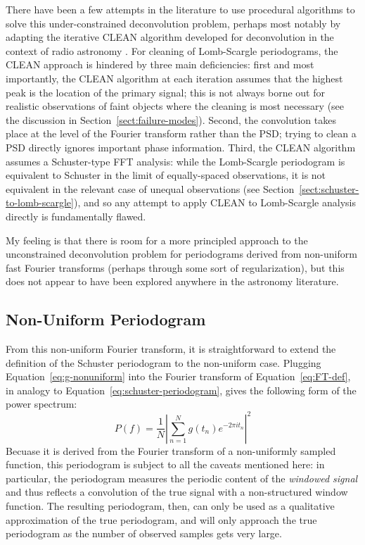 \documentclass[preprint]{aastex}
\newcommand{\Eq}[1]{Equation~\ref{eq:#1}}
\newcommand{\eq}[1]{\Eq{#1}}
\newcommand{\Sect}[1]{Section~\ref{sect:#1}}
\newcommand{\sect}[1]{\Sect{#1}}
\begin{document}
There have been a few attempts in the literature to use procedural algorithms
to solve this under-constrained deconvolution problem, perhaps most notably
by adapting the iterative CLEAN algorithm developed for deconvolution in the
context of radio astronomy \citep{Roberts87}.
For cleaning of Lomb-Scargle periodograms, the CLEAN approach is hindered by
three main deficiencies: first and most importantly, the CLEAN algorithm at each
iteration assumes that the highest peak is the location of the primary signal;
this is not always borne out for realistic observations of faint objects where
the cleaning is most necessary (see the discussion in \sect{failure-modes}).
Second, the convolution takes place at the level of the Fourier transform
rather than the PSD; trying to clean a PSD directly ignores important phase
information. Third, the CLEAN algorithm assumes a Schuster-type FFT analysis:
while the Lomb-Scargle periodogram is equivalent to Schuster in the limit of
equally-spaced observations, it is not equivalent in the relevant case of
unequal observations (see \sect{schuster-to-lomb-scargle}),
and so any attempt to apply CLEAN to Lomb-Scargle
analysis directly is fundamentally flawed.

My feeling is that there is room for a more principled approach to the
unconstrained deconvolution problem for periodograms derived from non-uniform
fast Fourier transforms (perhaps through some sort of regularization),
but this does not appear to have been explored anywhere in the astronomy
literature.

\subsection{Non-Uniform Periodogram}

From this non-uniform Fourier transform, it is straightforward to extend the
definition of the Schuster periodogram to the non-uniform case.
Plugging \eq{g-nonuniform} into the Fourier transform of \eq{FT-def}, in analogy to \eq{schuster-periodogram}, gives the following form of the power spectrum:
\begin{equation}
  P(f) = \frac{1}{N}\left|\sum_{n=1}^N g(t_n)e^{-2\pi i t_n} \right|^2
\end{equation}
Becuase it is derived from the Fourier transform of a non-uniformly sampled
function, this periodogram is subject to all the caveats mentioned here: in
particular, the periodogram measures the periodic content of the
{\it windowed signal} and thus reflects a convolution of the true signal
with a non-structured window function.
The resulting periodogram, then, can only be used as a qualitative approximation
of the true periodogram, and will only approach the true periodogram as the
number of observed samples gets very large.
\end{document}
